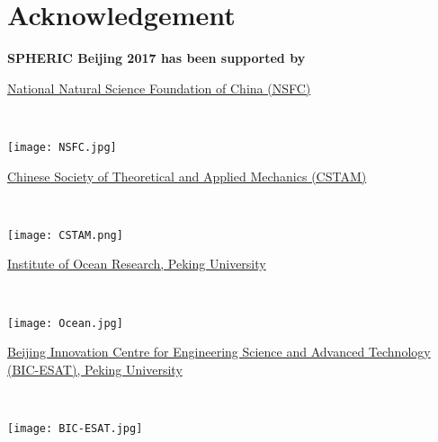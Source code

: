 \chapter*{Acknowledgement}

{\bf\Large SPHERIC Beijing 2017 has been supported by }
\vspace{1.5em}

\begin{minipage}[c]{0.42\linewidth}
\href{http://www.nsfc.gov.cn}{National Natural Science Foundation of China (NSFC)}
\end{minipage}
\begin{minipage}[c]{0.05\linewidth}
~
\end{minipage}
\begin{minipage}[c]{0.5\linewidth}
\texttt{[image: NSFC.jpg]}
\end{minipage}
\vspace{1em}


\begin{minipage}[c]{0.42\linewidth}
\href{http://www.cstam.org.cn}{Chinese Society of Theoretical and Applied Mechanics (CSTAM)}
\end{minipage}
\begin{minipage}[c]{0.05\linewidth}
~
\end{minipage}
\begin{minipage}[c]{0.5\linewidth}
\texttt{[image: CSTAM.png]}
\end{minipage}


\vspace{1em}

\begin{minipage}[c]{0.42\linewidth}
\href{http://ocean.pku.edu.cn}{Institute of Ocean Research, Peking University}
\end{minipage}
\begin{minipage}[c]{0.05\linewidth}
~
\end{minipage}
\begin{minipage}[c]{0.5\linewidth}
\texttt{[image: Ocean.jpg]}
\end{minipage}

\vspace{1em}

\begin{minipage}[c]{0.42\linewidth}
\href{http://www.pku.edu.cn}{Beijing Innovation Centre for Engineering Science and Advanced Technology (BIC-ESAT), Peking University}
\end{minipage}
\begin{minipage}[c]{0.05\linewidth}
~
\end{minipage}
\begin{minipage}[c]{0.5\linewidth}
\texttt{[image: BIC-ESAT.jpg]}
\end{minipage}

